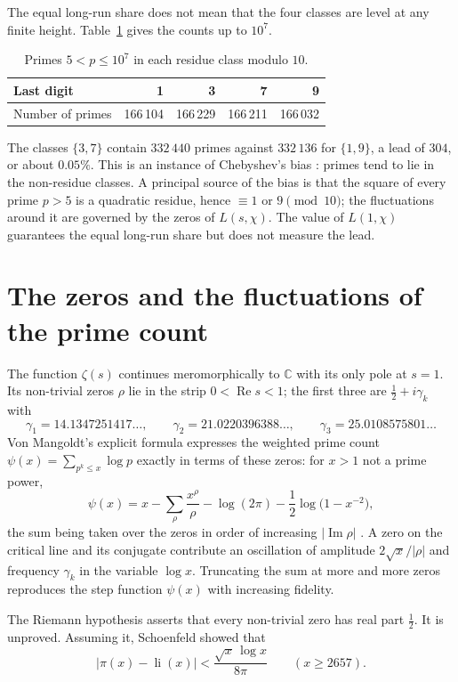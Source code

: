 \documentclass[11pt]{amsart}
\theoremstyle{remark}
\begin{document}
The equal long-run share does not mean that the four classes are level at any finite height. Table~\ref{tab:endings} gives the counts up to $10^7$.

\begin{table}[ht]
\centering
\caption{Primes $5<p\le10^7$ in each residue class modulo $10$.}\label{tab:endings}
\begin{tabular}{@{}lrrrr@{}}
\toprule
Last digit & 1 & 3 & 7 & 9\\
\midrule
Number of primes & 166\,104 & 166\,229 & 166\,211 & 166\,032\\
\bottomrule
\end{tabular}
\end{table}

The classes $\{3,7\}$ contain $332\,440$ primes against $332\,136$ for $\{1,9\}$, a lead of $304$, or about $0.05\%$. This is an instance of Chebyshev's bias \cite{RubinsteinSarnak1994,GranvilleMartin2006}: primes tend to lie in the non-residue classes. A principal source of the bias is that the square of every prime $p>5$ is a quadratic residue, hence $\equiv1$ or $9\pmod{10}$; the fluctuations around it are governed by the zeros of $L(s,\chi)$. The value of $L(1,\chi)$ guarantees the equal long-run share but does not measure the lead.

\section{The zeros and the fluctuations of the prime count}\label{sec:zeros}

The function $\zeta(s)$ continues meromorphically to $\mathbb{C}$ with its only pole at $s=1$. Its non-trivial zeros $\rho$ lie in the strip $0<\operatorname{Re}s<1$; the first three are $\tfrac12+i\gamma_k$ with
\[
\gamma_1=14.1347251417\ldots,\qquad\gamma_2=21.0220396388\ldots,\qquad\gamma_3=25.0108575801\ldots
\]
Von Mangoldt's explicit formula expresses the weighted prime count $\psi(x)=\sum_{p^k\le x}\log p$ exactly in terms of these zeros: for $x>1$ not a prime power,
\[
\psi(x)=x-\sum_\rho\frac{x^\rho}{\rho}-\log(2\pi)-\frac12\log\big(1-x^{-2}\big),
\]
the sum being taken over the zeros in order of increasing $|\operatorname{Im}\rho|$ \cite{Davenport1980}. A zero on the critical line and its conjugate contribute an oscillation of amplitude $2\sqrt x/|\rho|$ and frequency $\gamma_k$ in the variable $\log x$. Truncating the sum at more and more zeros reproduces the step function $\psi(x)$ with increasing fidelity.

The Riemann hypothesis asserts that every non-trivial zero has real part $\tfrac12$. It is unproved. Assuming it, Schoenfeld \cite{Schoenfeld1976} showed that
\[
|\pi(x)-\operatorname{li}(x)|<\frac{\sqrt x\,\log x}{8\pi}\qquad(x\ge2657).
\]
\end{document}
